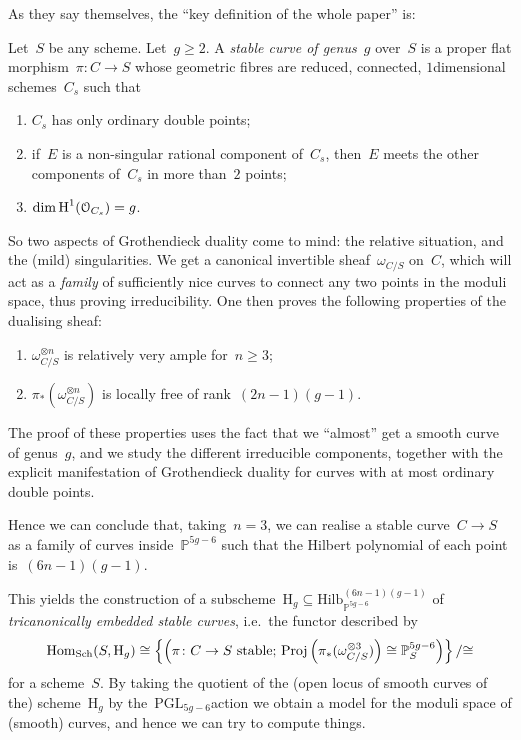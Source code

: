 \documentclass[10pt,a4paper]{article}
\begin{document}
As they say themselves, the ``key definition of the whole paper'' is:
\begin{definition}
  Let~$S$ be any scheme. Let~$g\geq 2$. A \emph{stable curve of genus~$g$} over~$S$ is a proper flat morphism~$\pi\colon C\to S$ whose geometric fibres are reduced, connected, $1$\dash dimensional schemes~$C_s$ such that
  \begin{enumerate}
    \item $C_s$ has only ordinary double points;
    \item if~$E$ is a non-singular rational component of~$C_s$, then~$E$ meets the other components of~$C_s$ in more than~$2$ points;
    \item $\dim\operatorname{H}^1(\mathcal{O}_{C_s})=g$.
  \end{enumerate}
\end{definition}
So two aspects of Grothendieck duality come to mind: the relative situation, and the (mild) singularities. We get a canonical invertible sheaf~$\omega_{C/S}$ on~$C$, which will act as a \emph{family} of sufficiently nice curves to connect any two points in the moduli space, thus proving irreducibility. One then proves the following properties of the dualising sheaf:
\begin{enumerate}
  \item $\omega_{C/S}^{\otimes n}$ is relatively very ample for~$n\geq 3$;
  \item $\pi_*(\omega_{C/S}^{\otimes n})$ is locally free of rank~$(2n-1)(g-1)$.
\end{enumerate}
The proof of these properties uses the fact that we ``almost'' get a smooth curve of genus~$g$, and we study the different irreducible components, together with the explicit manifestation of Grothendieck duality for curves with at most ordinary double points.

Hence we can conclude that, taking~$n=3$, we can realise a stable curve~$C\to S$ as a family of curves inside~$\mathbb{P}^{5g-6}$ such that the Hilbert polynomial of each point is~$(6n-1)(g-1)$.

This yields the construction of a subscheme~$\mathrm{H}_g\subseteq\mathrm{Hilb}_{\mathbb{P}^{5g-6}}^{(6n-1)(g-1)}$ of \emph{tricanonically embedded stable curves}, i.e.\ the functor described by
\begin{equation}
  \operatorname{Hom}_{\mathrm{Sch}}(S,\mathrm{H}_g)\cong\left\{ \left( \text{$\pi\colon C\to S$ stable; $\operatorname{Proj}\left( \pi_*(\omega_{C/S}^{\otimes 3}) \right)\cong\mathbb{P}_S^{5g-6}$} \right) \right\}/{\cong}
\end{equation}
for a scheme~$S$. By taking the quotient of the (open locus of smooth curves of the) scheme~$\mathrm{H}_g$ by the~$\mathrm{PGL}_{5g-6}$\dash action we obtain a model for the moduli space of (smooth) curves, and hence we can try to compute things.
\end{document}
